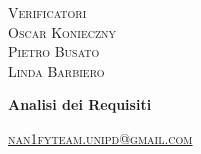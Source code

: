 \documentclass[8pt]{article}
\begin{document}
\begin{titlepage}
\begin{minipage}[t]{0.47\textwidth}
{		}
		\vspace{8mm}
		
		{\large{\textsc{Verificatori}}
			\vspace{3mm}
			{\\\large{\textsc{Oscar Konieczny}\\}} 
			{\large{\textsc{Pietro Busato}\\}}
			{\large{\textsc{Linda Barbiero}}}
			
		}
		\vspace{2mm}\vspace{2mm}
	\end{minipage}
	\vspace{4cm}
	\begin{center}
		\begin{flushright}
			{\fontsize{30pt}{52pt}\selectfont \textbf{Analisi dei Requisiti\\}} %
		\end{flushright}
		\vspace{3cm}
	\end{center}
	\vspace{9.5cm}
	{\small \textsc{\href{mailto: nan1fyteam.unipd@gmail.com}{\color{black}nan1fyteam.unipd@gmail.com}}}
\end{titlepage}
\pagestyle{mystyle}
\end{document}
